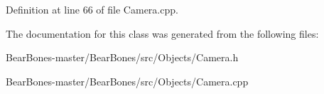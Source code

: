 Definition at line 66 of file Camera.\+cpp.



The documentation for this class was generated from the following files\+:\begin{DoxyCompactItemize}
\item 
Bear\+Bones-\/master/\+Bear\+Bones/src/\+Objects/Camera.\+h\item 
Bear\+Bones-\/master/\+Bear\+Bones/src/\+Objects/Camera.\+cpp\end{DoxyCompactItemize}
